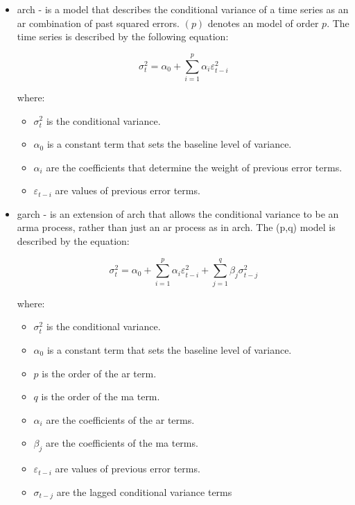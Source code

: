 \begin{itemize}
        The \gls{rw} without drift is often used as a benchmark for various forecasting models.

    \item \Gls{arch} \cite{engle} - is a model that describes the conditional variance of a time series as an \gls{ar} combination of past squared errors. $(p)$ denotes an  model of order $p$. The time series is described by the following equation:

        $$\sigma_{t}^2 = \alpha_{0} + \sum_{i=1}^{p}\alpha_{i}\varepsilon_{t-i}^2$$

    where:
    \begin{itemize}
        \item $\sigma_{t}^2$ is the conditional variance.
        \item $\alpha_{0}$ is a constant term that sets the baseline level of variance.
        \item $\alpha_{i}$ are the coefficients that determine the weight of previous error terms.
        \item $\varepsilon_{t-i}$ are values of previous error terms.
    \end{itemize}

    \item \Gls{garch} \cite{bollerslev} - is an extension of \gls{arch} that allows the conditional variance to be an \gls{arma} process, rather than just an \gls{ar} process as in \gls{arch}. The (p,q) model is described by the equation:

        $$\sigma_{t}^2 = \alpha_{0} + \sum_{i=1}^{p}\alpha_{i}\varepsilon_{t-i}^2 + \sum_{j=1}^{q}\beta_{j}\sigma_{t-j}^2$$

        where:
    \begin{itemize}
        \item $\sigma_{t}^2$ is the conditional variance.
        \item $\alpha_{0}$ is a constant term that sets the baseline level of variance.
        \item $p$ is the order of the \gls{ar} term.
        \item $q$ is the order of the \gls{ma} term.
        \item $\alpha_{i}$ are the coefficients of the \gls{ar} terms.
        \item $\beta_{j}$  are the coefficients of the \gls{ma} terms.
        \item $\varepsilon_{t-i}$ are values of previous error terms.
        \item $\sigma_{t-j}$ are the lagged conditional variance terms
    \end{itemize}

\end{itemize}

